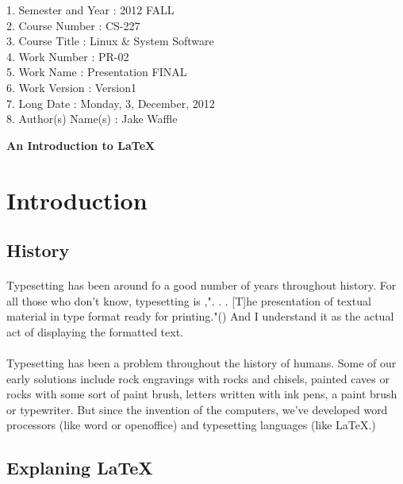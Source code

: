 \documentclass[letterpaper,12pt]{article}
\begin{document}
\doublespacing

\begin{flushleft}
1. Semester and Year : 2012 FALL\\
2. Course Number : CS-227\\
3. Course Title : Linux \& System Software\\
4. Work Number : PR-02\\
5. Work Name : Presentation FINAL\\
6. Work Version : Version1\\
7. Long Date : Monday, 3, December, 2012\\
8. Author(s) Name(s) : Jake Waffle\\
\end{flushleft}

\begin{center}
\textbf{\Large An Introduction to \LaTeX}
\end{center}


\section{Introduction}

\subsection{History}

\paragraph{}
Typesetting has been around fo a good number of years throughout history. For all those who don't know,
typesetting is ,". . . [T]he presentation of textual material in type format ready for printing."(\cite{Jackson})
And I understand it as the actual act of displaying the formatted text.

\paragraph{}
Typesetting has been a problem throughout the history of humans. Some of our early solutions include 
rock engravings with rocks and chisels, painted caves or rocks with some sort of paint brush, letters written with 
ink pens, a paint brush or typewriter. But since the invention of the computers, we've developed word processors (like word or openoffice) 
and typesetting languages (like \LaTeX.)

\subsection{Explaning \LaTeX}
\end{document}
